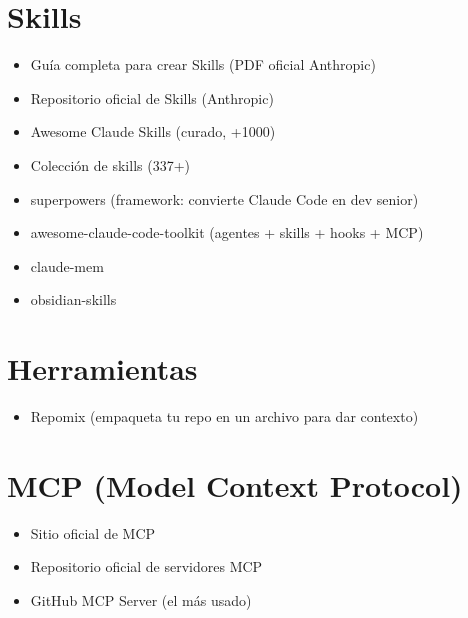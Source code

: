 \documentclass[11pt,a4paper]{book}
\begin{document}
\section{Skills}
\begin{itemize}\item Guía completa para crear Skills (PDF oficial Anthropic)\end{itemize}
\begin{itemize}\item Repositorio oficial de Skills (Anthropic)\end{itemize}
\begin{itemize}\item Awesome Claude Skills (curado, +1000)\end{itemize}
\begin{itemize}\item Colección de skills (337+)\end{itemize}
\begin{itemize}\item superpowers (framework: convierte Claude Code en dev senior)\end{itemize}
\begin{itemize}\item awesome-claude-code-toolkit (agentes + skills + hooks + MCP)\end{itemize}
\begin{itemize}\item claude-mem\end{itemize}
\begin{itemize}\item obsidian-skills\end{itemize}
\section{Herramientas}
\begin{itemize}\item Repomix (empaqueta tu repo en un archivo para dar contexto)\end{itemize}
\section{MCP (Model Context Protocol)}
\begin{itemize}\item Sitio oficial de MCP\end{itemize}
\begin{itemize}\item Repositorio oficial de servidores MCP\end{itemize}
\begin{itemize}\item GitHub MCP Server (el más usado)\end{itemize}
\end{document}
